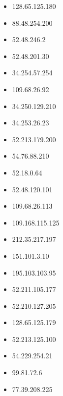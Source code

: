 \documentclass{article}
\begin{document}
\begin{itemize}
        \item 128.65.125.180
    
        \item 88.48.254.200
    
        \item 52.48.246.2
    
        \item 52.48.201.30
    
        \item 34.254.57.254
    
        \item 109.68.26.92
    
        \item 34.250.129.210
    
        \item 34.253.26.23
    
        \item 52.213.179.200
    
        \item 54.76.88.210
    
        \item 52.18.0.64
    
        \item 52.48.120.101
    
        \item 109.68.26.113
    
        \item 109.168.115.125
    
        \item 212.35.217.197
    
        \item 151.101.3.10
    
        \item 195.103.103.95
    
        \item 52.211.105.177
    
        \item 52.210.127.205
    
        \item 128.65.125.179
    
        \item 52.213.125.100
    
        \item 54.229.254.21
    
        \item 99.81.72.6
    
        \item 77.39.208.225
    

\end{itemize}
\end{document}
